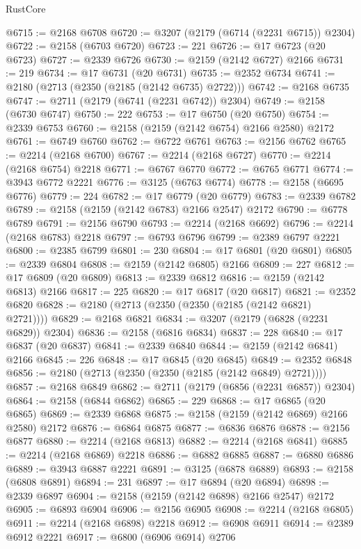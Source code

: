\begin{lexlean}{RustCore}
\begin{coremodule}
@6715 := @2168 @6708
@6720 := @3207 (@2179 (@6714 (@2231 @6715)) @2304)
@6722 := @2158 (@6703 @6720)
@6723 := 221
@6726 := @17 @6723 (@20 @6723)
@6727 := @2339 @6726
@6730 := @2159 (@2142 @6727) @2166
@6731 := 219
@6734 := @17 @6731 (@20 @6731)
@6735 := @2352 @6734
@6741 := @2180 (@2713 (@2350 (@2185 (@2142 @6735) @2722)))
@6742 := @2168 @6735
@6747 := @2711 (@2179 (@6741 (@2231 @6742)) @2304)
@6749 := @2158 (@6730 @6747)
@6750 := 222
@6753 := @17 @6750 (@20 @6750)
@6754 := @2339 @6753
@6760 := @2158 (@2159 (@2142 @6754) @2166 @2580) @2172
@6761 := @6749 @6760
@6762 := @6722 @6761
@6763 := @2156 @6762
@6765 := @2214 (@2168 @6700)
@6767 := @2214 (@2168 @6727)
@6770 := @2214 (@2168 @6754) @2218
@6771 := @6767 @6770
@6772 := @6765 @6771
@6774 := @3943 @6772 @2221
@6776 := @3125 (@6763 @6774)
@6778 := @2158 (@6695 @6776)
@6779 := 224
@6782 := @17 @6779 (@20 @6779)
@6783 := @2339 @6782
@6789 := @2158 (@2159 (@2142 @6783) @2166 @2547) @2172
@6790 := @6778 @6789
@6791 := @2156 @6790
@6793 := @2214 (@2168 @6692)
@6796 := @2214 (@2168 @6783) @2218
@6797 := @6793 @6796
@6799 := @2389 @6797 @2221
@6800 := @2385 @6799
@6801 := 230
@6804 := @17 @6801 (@20 @6801)
@6805 := @2339 @6804
@6808 := @2159 (@2142 @6805) @2166
@6809 := 227
@6812 := @17 @6809 (@20 @6809)
@6813 := @2339 @6812
@6816 := @2159 (@2142 @6813) @2166
@6817 := 225
@6820 := @17 @6817 (@20 @6817)
@6821 := @2352 @6820
@6828 := @2180 (@2713 (@2350 (@2350 (@2185 (@2142 @6821) @2721))))
@6829 := @2168 @6821
@6834 := @3207 (@2179 (@6828 (@2231 @6829)) @2304)
@6836 := @2158 (@6816 @6834)
@6837 := 228
@6840 := @17 @6837 (@20 @6837)
@6841 := @2339 @6840
@6844 := @2159 (@2142 @6841) @2166
@6845 := 226
@6848 := @17 @6845 (@20 @6845)
@6849 := @2352 @6848
@6856 := @2180 (@2713 (@2350 (@2350 (@2185 (@2142 @6849) @2721))))
@6857 := @2168 @6849
@6862 := @2711 (@2179 (@6856 (@2231 @6857)) @2304)
@6864 := @2158 (@6844 @6862)
@6865 := 229
@6868 := @17 @6865 (@20 @6865)
@6869 := @2339 @6868
@6875 := @2158 (@2159 (@2142 @6869) @2166 @2580) @2172
@6876 := @6864 @6875
@6877 := @6836 @6876
@6878 := @2156 @6877
@6880 := @2214 (@2168 @6813)
@6882 := @2214 (@2168 @6841)
@6885 := @2214 (@2168 @6869) @2218
@6886 := @6882 @6885
@6887 := @6880 @6886
@6889 := @3943 @6887 @2221
@6891 := @3125 (@6878 @6889)
@6893 := @2158 (@6808 @6891)
@6894 := 231
@6897 := @17 @6894 (@20 @6894)
@6898 := @2339 @6897
@6904 := @2158 (@2159 (@2142 @6898) @2166 @2547) @2172
@6905 := @6893 @6904
@6906 := @2156 @6905
@6908 := @2214 (@2168 @6805)
@6911 := @2214 (@2168 @6898) @2218
@6912 := @6908 @6911
@6914 := @2389 @6912 @2221
@6917 := @6800 (@6906 @6914) @2706

\end{coremodule}
\end{lexlean}
